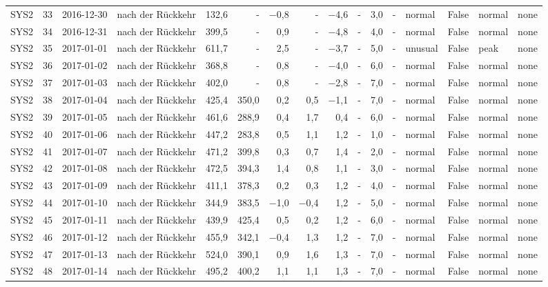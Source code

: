 \begin{tabular}{lrllrrrrrrrrlrll}
SYS2 & 33 & 2016-12-30 & nach der Rückkehr & 132,6 & - & $-$0,8 & - & $-$4,6 & - & 3,0 & - & normal & False & normal & none \\
SYS2 & 34 & 2016-12-31 & nach der Rückkehr & 399,5 & - & 0,9 & - & $-$4,8 & - & 4,0 & - & normal & False & normal & none \\
SYS2 & 35 & 2017-01-01 & nach der Rückkehr & 611,7 & - & 2,5 & - & $-$3,7 & - & 5,0 & - & unusual & False & peak & none \\
SYS2 & 36 & 2017-01-02 & nach der Rückkehr & 368,8 & - & 0,8 & - & $-$4,0 & - & 6,0 & - & normal & False & normal & none \\
SYS2 & 37 & 2017-01-03 & nach der Rückkehr & 402,0 & - & 0,8 & - & $-$2,8 & - & 7,0 & - & normal & False & normal & none \\
SYS2 & 38 & 2017-01-04 & nach der Rückkehr & 425,4 & 350,0 & 0,2 & 0,5 & $-$1,1 & - & 7,0 & - & normal & False & normal & none \\
SYS2 & 39 & 2017-01-05 & nach der Rückkehr & 461,6 & 288,9 & 0,4 & 1,7 & 0,4 & - & 6,0 & - & normal & False & normal & none \\
SYS2 & 40 & 2017-01-06 & nach der Rückkehr & 447,2 & 283,8 & 0,5 & 1,1 & 1,2 & - & 1,0 & - & normal & False & normal & none \\
SYS2 & 41 & 2017-01-07 & nach der Rückkehr & 471,2 & 399,8 & 0,3 & 0,7 & 1,4 & - & 2,0 & - & normal & False & normal & none \\
SYS2 & 42 & 2017-01-08 & nach der Rückkehr & 472,5 & 394,3 & 1,4 & 0,8 & 1,1 & - & 3,0 & - & normal & False & normal & none \\
SYS2 & 43 & 2017-01-09 & nach der Rückkehr & 411,1 & 378,3 & 0,2 & 0,3 & 1,2 & - & 4,0 & - & normal & False & normal & none \\
SYS2 & 44 & 2017-01-10 & nach der Rückkehr & 344,9 & 383,5 & $-$1,0 & $-$0,4 & 1,2 & - & 5,0 & - & normal & False & normal & none \\
SYS2 & 45 & 2017-01-11 & nach der Rückkehr & 439,9 & 425,4 & 0,5 & 0,2 & 1,2 & - & 6,0 & - & normal & False & normal & none \\
SYS2 & 46 & 2017-01-12 & nach der Rückkehr & 455,9 & 342,1 & $-$0,4 & 1,3 & 1,2 & - & 7,0 & - & normal & False & normal & none \\
SYS2 & 47 & 2017-01-13 & nach der Rückkehr & 524,0 & 390,1 & 0,9 & 1,6 & 1,3 & - & 7,0 & - & normal & False & normal & none \\
SYS2 & 48 & 2017-01-14 & nach der Rückkehr & 495,2 & 400,2 & 1,1 & 1,1 & 1,3 & - & 7,0 & - & normal & False & normal & none \\

\end{tabular}
